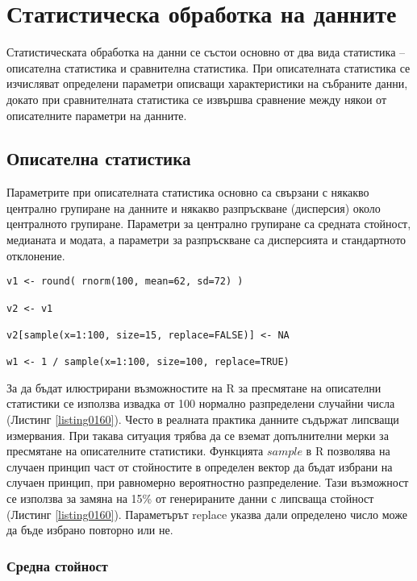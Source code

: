 ﻿\newpage
\chapter{Статистическа обработка на данните}
\label{chapter09}
\thispagestyle{empty}

Статистическата обработка на данни се състои основно от два вида статистика – описателна статистика и сравнителна статистика. При описателната статистика се изчисляват определени параметри описващи характеристики на събраните данни, докато при сравнителната статистика се извършва сравнение между някои от описателните параметри на данните. 

\section{Описателна статистика}

Параметрите при описателната статистика основно са свързани с някакво централно групиране на данните и някакво разпръскване (дисперсия) около централното групиране. Параметри за централно групиране са средната стойност, медианата и модата, а параметри за разпръскване са дисперсията и стандартното отклонение.

\begin{lstlisting}[caption=Генериране на извадка от случайни числа, label=listing0160]
v1 <- round( rnorm(100, mean=62, sd=72) )

v2 <- v1

v2[sample(x=1:100, size=15, replace=FALSE)] <- NA

w1 <- 1 / sample(x=1:100, size=100, replace=TRUE)
\end{lstlisting}

За да бъдат илюстрирани възможностите на R за пресмятане на описателни статистики се използва извадка от 100 нормално разпределени случайни числа (Листинг \ref{listing0160}). Често в реалната практика данните съдържат липсващи измервания. При такава ситуация трябва да се вземат допълнителни мерки за пресмятане на описателните статистики. Функцията $sample$ в R позволява на случаен принцип част от стойностите в определен вектор да бъдат избрани на случаен принцип, при равномерно вероятностно разпределение. Тази възможност се използва за замяна на 15\% от генерираните данни с липсваща стойност (Листинг \ref{listing0160}). Параметърът replace указва дали определено число може да бъде избрано повторно или не.

\subsection{Средна стойност}

